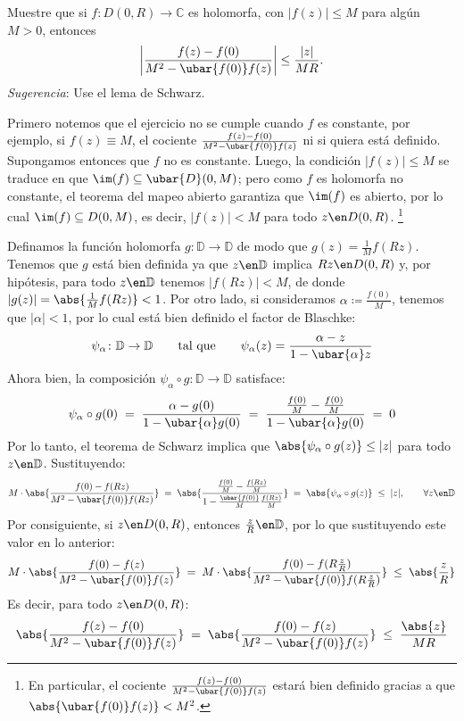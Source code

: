 \setcounter{eje}{10}
\begin{ejer}
Muestre que si $f\colon D(0, R) \to \mathbb{C}$ es holomorfa, con $|f(z)| \le M$ para algún $M > 0$, entonces
\[ \left| \frac{f(z) - f(0)}{M^2 - \ubar{f(0)}f(z)} \right| \le \frac{|z|}{MR}. \]
\emph{Sugerencia}: Use el lema de Schwarz.
\end{ejer}
\begin{sol}
Primero notemos que el ejercicio no se cumple cuando $f$ es constante, por ejemplo, si $f(z) \equiv M$, el cociente $\frac{f(z) - f(0)}{M^2 - \ubar{f(0)}f(z)}$ ni si quiera está definido. Supongamos entonces que $f$ no es constante. Luego, la condición $|f(z)| \le M$ se traduce en que $\im(f) \subseteq \ubar{D}(0,M)$; pero como $f$ es holomorfa no constante, el teorema del mapeo abierto garantiza que $\im(f)$ es abierto, por lo cual $\im(f) \subseteq D(0,M)$, es decir, $|f(z)| < M$ para todo $z\en D(0,R)$.%
\footnote{
    En particular, el cociente $\frac{f(z) - f(0)}{M^2 - \ubar{f(0)}f(z)}$ estará bien definido gracias a que $\abs{\ubar{f(0)}f(z)} < M^2$.
}
\par
Definamos la función holomorfa $g \colon \mathbb{D} \to \mathbb{D}$ de modo que $g(z) = \frac{1}{M}f(Rz)$. Tenemos que $g$ está bien definida ya que $z\en\mathbb{D}$ implica $Rz\en D(0,R)$ y, por hipótesis, para todo $z\en\mathbb{D}$ tenemos $|f(Rz)| <M$, de donde $|g(z)| = \abs{\frac{1}{M}f(Rz)} < 1$. Por otro lado, si consideramos $\alpha \coloneqq \frac{f(0)}{M}$, tenemos que $|\alpha|<1$, por lo cual está bien definido el factor de Blaschke:
\[
\psi_\alpha \colon \mathbb{D} \to \mathbb{D}
\qquad\text{tal que}\qquad
\psi_\alpha(z) = \frac{\alpha-z}{1-\ubar{\alpha}z}
\]
Ahora bien, la composición $\psi_\alpha \circ g \colon \mathbb{D} \to \mathbb{D}$ satisface:
\[
\psi_\alpha \circ g(0) 
\;=\; \frac{\alpha-g(0)}{1-\ubar{\alpha}g(0)}
\;=\; \frac{\frac{f(0)}{M}-\frac{f(0)}{M}}{1-\ubar{\alpha}g(0)}
\;=\; 0
\]
Por lo tanto, el teorema de Schwarz implica que $\abs{\psi_\alpha \circ g(z)} \le |z|$ para todo $z\en\mathbb{D}$. Sustituyendo:
\[
M\cdot\abs{ \frac{f(0) - f(Rz)}{M^2 - \ubar{f(0)}f(Rz)} }
\;=\; \abs{
    \frac{ \frac{f(0)}{M} - \frac{f(Rz)}{M} }{ 1 - \frac{\ubar{f(0)}}{M}\frac{f(Rz)}{M} }
}
\;=\; \abs{\psi_\alpha \circ g(z)} 
\;\le\; |z|,
\qquad\forall z\en\mathbb{D}
\]
Por consiguiente, si $z\en D(0,R)$, entonces $\frac{z}{R} \en \mathbb{D}$, por lo que sustituyendo este valor en lo anterior:
\[
M\cdot\abs{ \frac{f(0) - f(z)}{M^2 - \ubar{f(0)}f(z)} }
\;=\; M\cdot\abs{ \frac{f(0) - f(R\frac{z}{R})}{M^2 - \ubar{f(0)}f(R\frac{z}{R})} }
\;\leq\; \abs{\frac{z}{R}}
\]
Es decir, para todo $z\en D(0,R)$:
\[
\abs{ \frac{f(z) - f(0)}{M^2 - \ubar{f(0)}f(z)} } 
\;=\;\abs{ \frac{f(0) - f(z)}{M^2 - \ubar{f(0)}f(z)} } 
\;\leq\; \frac{\abs{z}}{MR}
\]
\end{sol}
